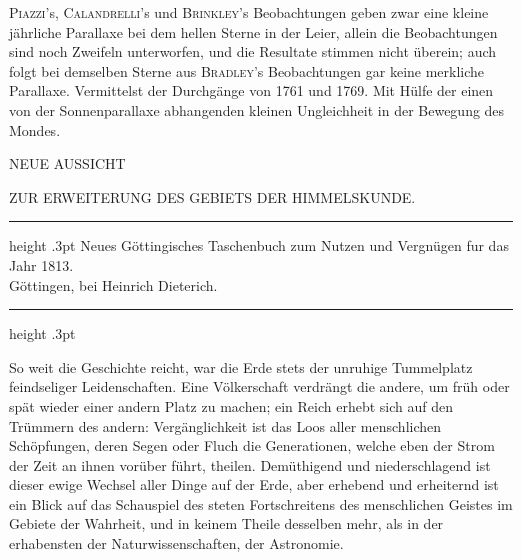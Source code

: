 \par\clearpage
{}
\expandafter\def\csname HistoricalNoteText13\endcsname{\textsc{Piazzi}'s, \textsc{Calandrelli}'s und \textsc{Brinkley}'s Beobachtungen geben zwar eine kleine jährliche Parallaxe bei dem hellen Sterne in der Leier, allein die Beobachtungen sind noch Zweifeln unterworfen, und die Resultate stimmen nicht überein; auch folgt bei demselben Sterne aus \textsc{Bradley}'s Beobachtungen gar keine merkliche Parallaxe.}%
\expandafter\def\csname HistoricalNoteText14\endcsname{Vermittelst der Durchgänge von 1761 und 1769.}%
\expandafter\def\csname HistoricalNoteText15\endcsname{Mit Hülfe der einen von der Sonnenparallaxe abhangenden kleinen Ungleichheit in der Bewegung des Mondes.}%
\begingroup
\pagestyle{empty}
\thispagestyle{empty}
%
\vspace*{.15\textheight}
\begin{center}
{\small NEUE AUSSICHT\par}
\smallskip
ZUR ERWEITERUNG DES GEBIETS DER HIMMELSKUNDE.\par
\end{center}
\begin{center}
\parbox{.80\linewidth}{%
  \centering\fontsize{8}{10}\selectfont\frenchspacing
  \hrule height .3pt\relax\vspace{3pt}
  Neues Göttingisches Taschenbuch zum Nutzen und Vergnügen fur das Jahr 1813.\\
  Göttingen, bei Heinrich Dieterich.\par
  \vspace{3pt}\hrule height .3pt\relax
}
\end{center}
\par\indent So weit die Geschichte reicht, war die Erde stets der unruhige Tummelplatz feindseliger Leidenschaften. Eine Völkerschaft verdrängt die andere, um früh oder spät wieder einer andern Platz zu machen; ein Reich erhebt sich auf den Trümmern des andern: Vergänglichkeit ist das Loos aller menschlichen Schöpfungen, deren Segen oder Fluch die Generationen, welche eben der Strom der Zeit an ihnen vorüber führt, theilen. Demüthigend und niederschlagend ist dieser ewige Wechsel aller Dinge auf der Erde, aber erhebend und erheiternd ist ein Blick auf das Schauspiel des steten Fortschreitens des menschlichen Geistes im Gebiete der Wahrheit, und in keinem Theile desselben mehr, als in der erhabensten der Naturwissenschaften, der Astronomie.

